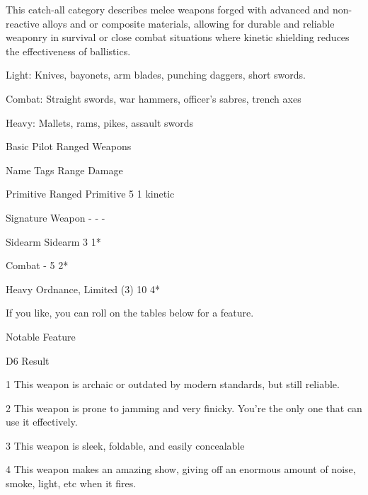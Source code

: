 This catch-all category describes melee weapons forged with advanced and non-reactive alloys and or  
composite materials, allowing for durable and reliable weaponry in survival or close combat situations  
where kinetic shielding reduces the effectiveness of ballistics. 
 

Light: Knives, bayonets, arm blades, punching daggers, short swords.
 
Combat: Straight swords, war hammers, officer’s sabres, trench axes
 

Heavy: Mallets, rams, pikes, assault swords
 

                                             Basic Pilot Ranged Weapons  

  Name                        Tags                                             Range               Damage 

 Primitive Ranged              Primitive                                       5                   1 kinetic 

 Signature Weapon             -                                                -                   - 

                  Sidearm     Sidearm                                          3                   1* 

                   Combat     -                                                5                   2* 

                     Heavy    Ordnance, Limited (3)                            10                  4* 

If you like, you can roll on the tables below for a feature.
 

                                                      Notable Feature
 

                                                                                                                          


 D6      Result 

 1       This weapon is archaic or outdated by modern standards, but still reliable. 

 2       This weapon is prone to jamming and very finicky. You’re the only one that can use it effectively. 

 3       This weapon is sleek, foldable, and easily concealable 

 4       This weapon makes an amazing show, giving off an enormous amount of noise, smoke, light, etc when it  
         fires. 

